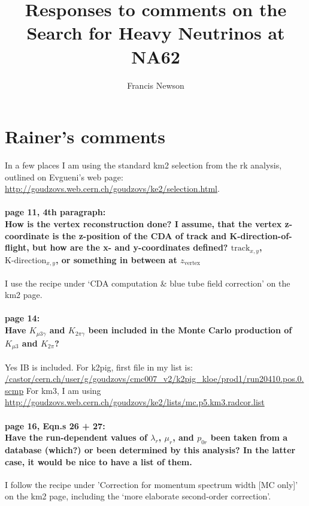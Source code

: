 \documentclass[12pt]{report}
\title{Responses to comments on the Search for Heavy Neutrinos at NA62}
\author{Francis Newson}
\begin{document}
\maketitle

\section{Rainer's comments}
In a few places I am using the standard km2 selection from the rk analysis, outlined on Evgueni's web page: \url{http://goudzovs.web.cern.ch/goudzovs/ke2/selection.html}. 

\paragraph{page 11, 4th paragraph:  \\
    How is the vertex reconstruction done? I assume, that the vertex z-coordinate is the z-position of the CDA of track and K-direction-of-flight, but how are the x- and y-coordinates defined? $\textrm{track}_{x,y}$, $\textrm{K-direction}_{x,y}$, or something in between at $z_\textrm{vertex}$\\
}
I use the recipe under `CDA computation \& blue tube field correction' on the km2 page.

\paragraph{page 14: \\
    Have $K_{\mu 3\gamma}$ and $K_{2\pi\gamma}$ been included in the Monte Carlo production of $K_{\mu 3}$ and $K_{2\pi}$?\\
}
Yes IB is included. For k2pig, first file in my list is: 
\url{/castor/cern.ch/user/g/goudzovs/cmc007_v2/k2pig_kloe/prod1/run20410.pos.0.scmp}
For km3, I am using \url{http://goudzovs.web.cern.ch/goudzovs/ke2/lists/mc.p5.km3.radcor.list
}

\paragraph{page 16, Eqn.s 26 + 27: \\
    Have the run-dependent values of $\lambda_r$, $\mu_r$, and $p_{0r}$ been taken from a database (which?) or been determined by this analysis? In the latter case, it would be nice to have a list of them.\\  
} 
I follow the recipe under 'Correction for momentum spectrum width [MC only]’ on the km2 page, including the `more elaborate second-order correction'.
\end{document}

